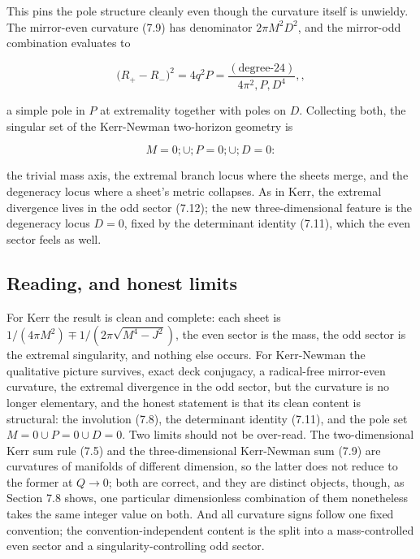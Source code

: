 \documentclass[11pt]{article}
\begin{document}
This pins the pole structure cleanly even though the curvature itself is unwieldy. The mirror-even curvature (7.9) has denominator $2\pi M^2 D^2$, and the mirror-odd combination evaluates to

\begin{equation*}
\big(R_+ - R_-\big)^2 = 4q^2 P = \frac{(\text{degree-}24)}{4\pi^2, P, D^4}, ,
\tag{7.12}
\end{equation*}

a simple pole in $P$ at extremality together with poles on $D$. Collecting both, the singular set of the Kerr-Newman two-horizon geometry is

\begin{equation*}
{M = 0} ;\cup; {P = 0} ;\cup; {D = 0}:
\end{equation*}

the trivial mass axis, the extremal branch locus where the sheets merge, and the degeneracy locus where a sheet's metric collapses. As in Kerr, the extremal divergence lives in the odd sector (7.12); the new three-dimensional feature is the degeneracy locus $D = 0$, fixed by the determinant identity (7.11), which the even sector feels as well.

\subsection{Reading, and honest limits}

For Kerr the result is clean and complete: each sheet is $1/(4\pi M^2) \mp 1/(2\pi\sqrt{M^4 - J^2})$, the even sector is the mass, the odd sector is the extremal singularity, and nothing else occurs. For Kerr-Newman the qualitative picture survives, exact deck conjugacy, a radical-free mirror-even curvature, the extremal divergence in the odd sector, but the curvature is no longer elementary, and the honest statement is that its clean content is structural: the involution (7.8), the determinant identity (7.11), and the pole set ${M=0}\cup{P=0}\cup{D=0}$. Two limits should not be over-read. The two-dimensional Kerr sum rule (7.5) and the three-dimensional Kerr-Newman sum (7.9) are curvatures of manifolds of different dimension, so the latter does not reduce to the former at $Q \to 0$; both are correct, and they are distinct objects, though, as Section 7.8 shows, one particular dimensionless combination of them nonetheless takes the same integer value on both. And all curvature signs follow one fixed convention; the convention-independent content is the split into a mass-controlled even sector and a singularity-controlling odd sector.
\end{document}
